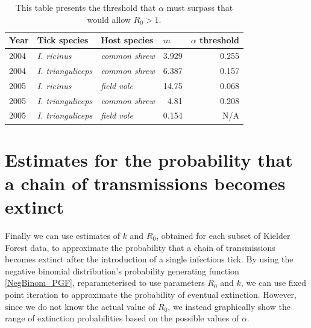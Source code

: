 \documentclass{article}
\begin{document}
\begin{table}[h]
	\begin{mdframed}[backgroundcolor=grey250,rightline=false,leftline=false,topline=false]
	\centering
	\begin{tabular}{|l|l|l|r|r|}
		\hline
		\textbf{Year} & \textbf{Tick species} & \textbf{Host species} & \multicolumn{1}{l|}{\textbf{$m$}} & \multicolumn{1}{l|}{\textbf{$ \alpha $ threshold}} \\ \hline
		2004          & \textit{I. ricinus}            & \textit{common shrew}          & 3.929                             & 0.255                                              \\ \hline
		2004          & \textit{I. trianguliceps}      & \textit{common shrew}         & 6.387                             & 0.157                                              \\ \hline
		2005          & \textit{I. ricinus}            & \textit{field vole}           & 14.75                             & 0.068                                              \\ \hline
		2005          & \textit{I. trianguliceps}      & \textit{common shrew}          & 4.81                              & 0.208                                              \\ \hline
		2005          & \textit{I. trianguliceps}      & \textit{field vole}            & 0.154                             & N/A                                                \\ \hline
	\end{tabular}
	\caption{This table presents the threshold that $ \alpha $ must surpass that would allow $ R_0 > 1 $.} 
	\label{tab:alpha_threshold}
	\end{mdframed}
\end{table}

\newpage

\section{Estimates for the probability that a chain of transmissions becomes extinct} 

Finally we can use estimates of $ k $ and $ R_0 $, obtained for each subset of Kielder Forest data, to approximate the probability that a chain of transmissions becomes extinct after the introduction of a single infectious tick. By using the negative binomial distribution's probability generating function \eqref{NegBinom_PGF}, reparameterised to use parameters $ R_0 $ and $ k $, we can use fixed point iteration to approximate the probability of eventual extinction. However, since we do not know the actual value of $ R_0 $, we instead graphically show the range of extinction probabilities based on the possible values of $ \alpha $.
\end{document}
